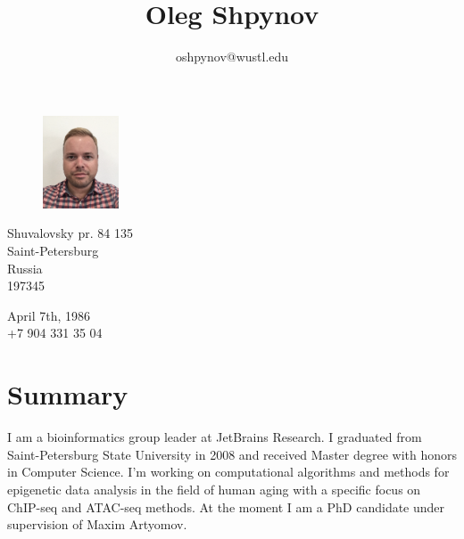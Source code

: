 \documentclass[11pt]{article}
\title{\bfseries\Huge Oleg Shpynov}
\author{oshpynov@wustl.edu}
\date{}
\begin{document}
\begin{figure}
    \vspace*{-4cm} %
	\hfill\includegraphics[width=0.20\textwidth]{me2020.png}
    \vspace*{-4cm} %
\end{figure}

\maketitle 

\begin{minipage}[ht]{0.4\textwidth}
Shuvalovsky pr. 84 135\\
Saint-Petersburg\\
Russia\\
197345
\end{minipage}
\begin{minipage}[ht]{0.3\textwidth}
April 7th, 1986\\
+7 904 331 35 04
\end{minipage}
\vspace{10pt}

\section*{Summary}
I am a bioinformatics group leader at JetBrains Research. I graduated from Saint-Petersburg State University in 2008 and received Master degree with honors in Computer Science. I'm working on computational algorithms and methods for epigenetic data analysis in the field of human aging with a specific focus on ChIP-seq and ATAC-seq methods. At the moment I am a PhD candidate under supervision of Maxim Artyomov.

\end{document}
